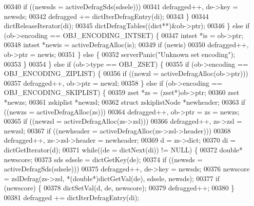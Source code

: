 \begin{DoxyCode}
00340                 \textcolor{keywordflow}{if} ((newsds = activeDefragSds(sdsele)))
00341                     defragged++, de->key = newsds;
00342                 defragged += dictIterDefragEntry(di);
00343             \}
00344             dictReleaseIterator(di);
00345             dictDefragTables((dict**)&ob->ptr);
00346         \} \textcolor{keywordflow}{else} \textcolor{keywordflow}{if} (ob->encoding == OBJ\_ENCODING\_INTSET) \{
00347             intset *is = ob->ptr;
00348             intset *newis = activeDefragAlloc(is);
00349             \textcolor{keywordflow}{if} (newis)
00350                 defragged++, ob->ptr = newis;
00351         \} \textcolor{keywordflow}{else} \{
00352             serverPanic(\textcolor{stringliteral}{"Unknown set encoding"});
00353         \}
00354     \} \textcolor{keywordflow}{else} \textcolor{keywordflow}{if} (ob->type == OBJ\_ZSET) \{
00355         \textcolor{keywordflow}{if} (ob->encoding == OBJ\_ENCODING\_ZIPLIST) \{
00356             \textcolor{keywordflow}{if} ((newzl = activeDefragAlloc(ob->ptr)))
00357                 defragged++, ob->ptr = newzl;
00358         \} \textcolor{keywordflow}{else} \textcolor{keywordflow}{if} (ob->encoding == OBJ\_ENCODING\_SKIPLIST) \{
00359             zset *zs = (zset*)ob->ptr;
00360             zset *newzs;
00361             zskiplist *newzsl;
00362             \textcolor{keyword}{struct} zskiplistNode *newheader;
00363             \textcolor{keywordflow}{if} ((newzs = activeDefragAlloc(zs)))
00364                 defragged++, ob->ptr = zs = newzs;
00365             \textcolor{keywordflow}{if} ((newzsl = activeDefragAlloc(zs->zsl)))
00366                 defragged++, zs->zsl = newzsl;
00367             \textcolor{keywordflow}{if} ((newheader = activeDefragAlloc(zs->zsl->header)))
00368                 defragged++, zs->zsl->header = newheader;
00369             d = zs->dict;
00370             di = dictGetIterator(d);
00371             \textcolor{keywordflow}{while}((de = dictNext(di)) != NULL) \{
00372                 \textcolor{keywordtype}{double}* newscore;
00373                 sds sdsele = dictGetKey(de);
00374                 \textcolor{keywordflow}{if} ((newsds = activeDefragSds(sdsele)))
00375                     defragged++, de->key = newsds;
00376                 newscore = zslDefrag(zs->zsl, *(\textcolor{keywordtype}{double}*)dictGetVal(de), sdsele, newsds);
00377                 \textcolor{keywordflow}{if} (newscore) \{
00378                     dictSetVal(d, de, newscore);
00379                     defragged++;
00380                 \}
00381                 defragged += dictIterDefragEntry(di);

\end{DoxyCode}
